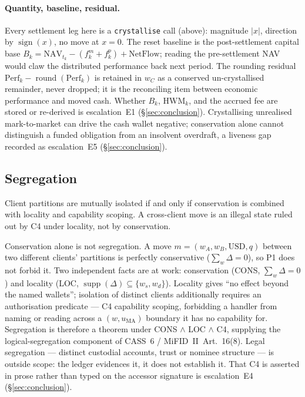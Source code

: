 \paragraph{Quantity, baseline, residual.} Every settlement leg here is a \texttt{crystallise}
call (above): magnitude $|x|$, direction by $\operatorname{sign}(x)$, no move at $x=0$.
The reset baseline is the post-settlement capital base
$B_k=\mathrm{NAV}_{t_k}-(f^{m}_k+f^{p}_k)+\mathrm{NetFlow}$; reading the pre-settlement NAV would
claw the distributed performance back next period. The rounding residual
$\mathrm{Perf}_k-\operatorname{round}(\mathrm{Perf}_k)$ is retained in $w_C$ as a conserved
un-crystallised remainder, never dropped; it is the reconciling item between economic performance
and moved cash. Whether $B_k$, $\mathrm{HWM}_k$, and the accrued fee are stored or re-derived is
escalation~E1 (\S\ref{sec:conclusion}). Crystallising unrealised mark-to-market can drive the cash
wallet negative; conservation alone cannot distinguish a funded obligation from an insolvent
overdraft, a liveness gap recorded as escalation~E5 (\S\ref{sec:conclusion}).

\subsection{Segregation}
\label{sec:sec09-segregation}

\begin{theorem}[Segregation]
\label{thm:seg}
Client partitions are mutually isolated if and only if conservation is combined with locality and
capability scoping. A cross-client move is an illegal state ruled out by C4 under locality, not by
conservation.
\end{theorem}

Conservation alone is not segregation. A move $m=(w_A,w_B,\text{USD},q)$ between two different
clients' partitions is perfectly conservative ($\sum_w\Delta=0$), so P1 does not forbid it. Two
independent facts are at work: conservation (CONS, $\sum_w\Delta=0$) and locality (LOC,
$\operatorname{supp}(\Delta)\subseteq\{w_s,w_d\}$). Locality gives ``no effect beyond the named
wallets''; isolation of distinct clients additionally requires an authorisation predicate --- C4
capability scoping, forbidding a handler from naming or reading across a $(w,u_{\mathrm{MA}})$
boundary it has no capability for. Segregation is therefore a theorem under CONS $\wedge$ LOC
$\wedge$ C4, supplying the logical-segregation component of CASS~6 / MiFID~II~Art.~16(8). Legal
segregation --- distinct custodial accounts, trust or nominee structure --- is outside scope: the
ledger evidences it, it does not establish it. That C4 is asserted in prose rather than typed on
the accessor signature is escalation~E4 (\S\ref{sec:conclusion}).

